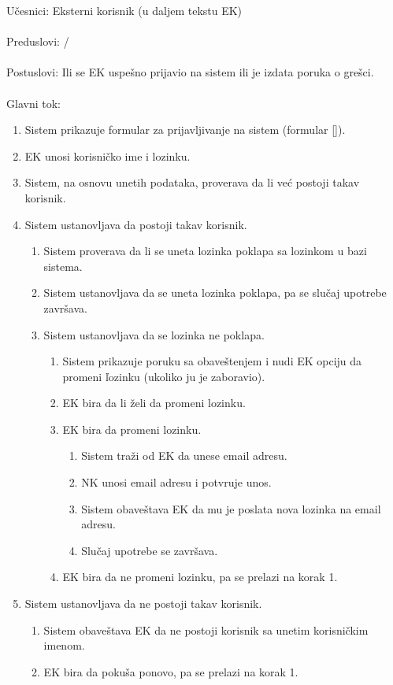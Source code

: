 \noindent U\v cesnici: Eksterni korisnik (u daljem tekstu EK)
\\
\\ Preduslovi: /
\\
\\ Postuslovi: Ili se EK uspe\v sno prijavio na sistem ili je izdata poruka o gre\v sci.
\\ 
\\ Glavni tok:
\begin{enumerate}
	\item Sistem prikazuje formular za prijavljivanje na sistem (formular \ref{}).
	\item EK unosi korisni\v cko ime i lozinku.
	\item Sistem, na osnovu unetih podataka, proverava da li ve\'c postoji takav korisnik.
	\item Sistem ustanovljava da postoji takav korisnik.
	\begin{enumerate}
		\item Sistem proverava da li se uneta lozinka poklapa sa lozinkom u bazi sistema.
		\item Sistem ustanovljava da se uneta lozinka poklapa, pa se slu\v caj upotrebe zavr\v sava.
		\item Sistem ustanovljava da se lozinka ne poklapa.
		\begin{enumerate}
			\item Sistem prikazuje poruku sa obave\v stenjem i nudi EK opciju da promeni \v lozinku (ukoliko ju je zaboravio).
			\item EK bira da li \v zeli da promeni lozinku.
			\item EK bira da promeni lozinku.
			\begin{enumerate}
				\item Sistem tra\v zi od EK da unese email adresu.
				\item NK unosi email adresu i potvr\dj uje unos.
				\item Sistem obave\v stava EK da mu je poslata nova lozinka na email adresu.
				\item Slu\v caj upotrebe se zavr\v sava.
			\end{enumerate}
			\item EK bira da ne promeni lozinku, pa se prelazi na korak 1.
		\end{enumerate}
	\end{enumerate}
	\item Sistem ustanovljava da ne postoji takav korisnik.
	\begin{enumerate}
		\item Sistem obave\v stava EK da ne postoji korisnik sa unetim korisni\v ckim imenom.
		\item EK bira da poku\v sa ponovo, pa se prelazi na korak 1.
	\end{enumerate}
\end{enumerate}

